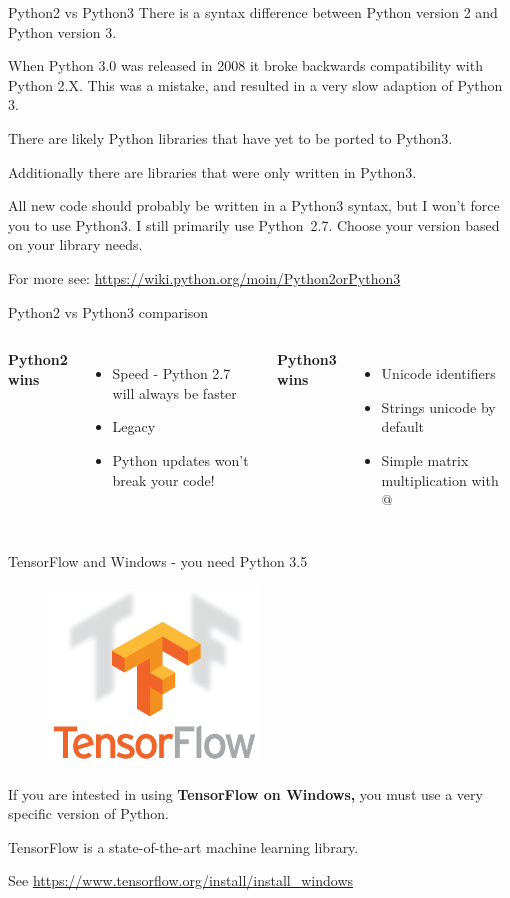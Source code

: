 \documentclass[10pt]{beamer}
\begin{document}
\begin{frame}{Python2 vs Python3}
There is a syntax difference between Python version 2 and Python version 3. 

When Python 3.0 was released in 2008 it broke backwards compatibility with Python 2.X. This was a mistake, and resulted in a very slow adaption of Python 3. 

There are likely Python libraries that have yet to be ported to Python3. 

Additionally there are libraries that were only written in Python3. 

All new code should probably be written in a Python3 syntax, but I won't force you to use Python3. I still primarily use Python~2.7. Choose your version based on your library needs.

For more see: \url{https://wiki.python.org/moin/Python2orPython3}
\end{frame}

\begin{frame}{Python2 vs Python3 comparison}
  \begin{columns}[onlytextwidth]
\textbf{Python2 wins}
\begin{itemize}
\item Speed - Python 2.7 will always be faster
\item Legacy
\item Python updates won't break your code!
\end{itemize}
\textbf{Python3 wins}
\begin{itemize}
\item Unicode identifiers
\item Strings unicode by default
\item Simple matrix multiplication with @
\end{itemize}
  \end{columns}
\end{frame}

\begin{frame}{TensorFlow and Windows - you need Python 3.5}
\begin{figure}
\includegraphics[width=0.5\textwidth]{figs/tf.png}
\end{figure}
If you are intested in using \textbf{TensorFlow on Windows,} you must use a very specific version of Python. 

TensorFlow is a state-of-the-art machine learning library. 

See \url{https://www.tensorflow.org/install/install_windows}
\end{frame}
\end{document}
